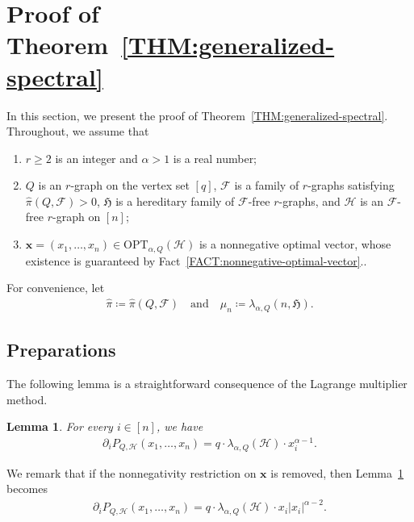 \documentclass[11pt,a4paper]{article}
\newtheorem{lemma}[definition]{Lemma}
\begin{document}
\section{Proof of Theorem~\ref{THM:generalized-spectral}}\label{SEC:Proof-generlized-spectral}
%
In this section, we present the proof of Theorem~\ref{THM:generalized-spectral}.
Throughout, we assume that 
\begin{enumerate}[label=(\roman*)]
    \item\label{Assume-a} $r \ge 2$ is an integer and $\alpha > 1$ is a real number; 
    \item\label{Assume-b} $Q$ is an $r$-graph on the vertex set $[q]$, $\mathcal{F}$ is a family of $r$-graphs satisfying $\hat{\pi}(Q,\mathcal{F}) > 0$, $\mathfrak{H}$ is a hereditary family of $\mathcal{F}$-free $r$-graphs, and $\mathcal{H}$ is an $\mathcal{F}$-free $r$-graph on $[n]$;
    \item\label{Assume-c} $\mathbf{x} = (x_1, \ldots, x_n) \in \mathrm{OPT}_{\alpha, Q}(\mathcal{H})$ is a nonnegative optimal vector, whose existence is guaranteed by Fact~\ref{FACT:nonnegative-optimal-vector}..
\end{enumerate}
%
For convenience, let 
\begin{align*}
    \hat{\pi} \coloneqq \hat{\pi}(Q,\mathcal{F})
    \quad\text{and}\quad 
    \mu_{n}
    \coloneqq \lambda_{\alpha, Q}(n, \mathfrak{H}). 
\end{align*}
%

\subsection{Preparations}\label{SUBSEC:Preparation-Proof-generlized-spectral}
%
The following lemma is a straightforward consequence of the Lagrange multiplier method. 
%
\begin{lemma}\label{LEMMA:Lagrange-multiplier}
    For every $i \in [n]$, we have 
    \begin{align*}
        \partial_{i} P_{Q,\mathcal{H}} (x_1, \ldots, x_n)
        = q \cdot \lambda_{\alpha, Q}(\mathcal{H}) \cdot x_i^{\alpha-1}. 
    \end{align*}
\end{lemma}

We remark that if the nonnegativity restriction on $\mathbf{x}$ is removed, then Lemma~\ref{LEMMA:Lagrange-multiplier} becomes
\begin{align*}
    \partial_{i} P_{Q,\mathcal{H}} (x_1, \ldots, x_n)
    = q \cdot \lambda_{\alpha, Q}(\mathcal{H}) \cdot x_i |x_{i}|^{\alpha-2}. 
\end{align*}
\end{document}
